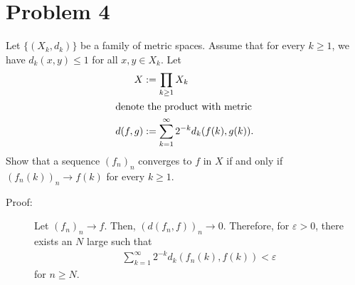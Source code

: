 \documentclass[8pt]{extarticle}
\begin{document}
  \section{Problem 4}%
    Let $\{(X_k,d_k)\}$ be a family of metric spaces. Assume that for every $k\geq 1$, we have $d_k(x,y)\leq 1$ for all $x,y\in X_k$. Let 
    \begin{align*}
      X &:= \prod_{k\geq 1}X_k\\
      \intertext{denote the product with metric}
      d(f,g) &:= \sum_{k=1}^{\infty}2^{-k}d_k(f(k),g(k)).
    \end{align*}
    Show that a sequence $(f_n)_n$ converges to $f$ in $X$ if and only if $(f_n(k))_n\rightarrow f(k)$ for every $k\geq 1$.
    \begin{description}
      \item[Proof:] Let $(f_n)_n\rightarrow f$. Then, $(d(f_n,f))_n\rightarrow 0$. Therefore, for $\varepsilon > 0$, there exists an $N$ large such that
        \begin{align*}
          \sum_{k=1}^{\infty}2^{-k}d_k(f_n(k),f(k)) < \varepsilon
        \end{align*}
        for $n\geq N$. 
    \end{description}
\end{document}
